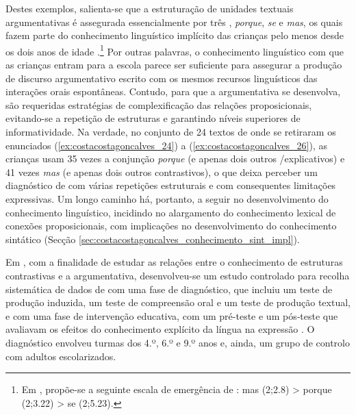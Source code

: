 \documentclass[output=paper]{LSP/langsci}
\begin{document}
Destes exemplos, salienta-se que a estruturação de unidades textuais argumentativas é assegurada essencialmente por três , \textit{porque}, \textit{se} e \textit{mas}, os quais fazem parte do conhecimento linguístico implícito das crianças pelo menos desde os dois anos de idade \citep{costa_etal2008}.\footnote{Em \citet{costa_etal2008}, propõe-se a seguinte escala de emergência de : mas (2;2.8) > porque (2;3.22) > se (2;5.23).} Por outras palavras, o conhecimento linguístico com que as crianças entram para a escola parece ser suficiente para assegurar a produção de discurso argumentativo escrito com os mesmos recursos linguísticos das interações orais espontâneas. Contudo, para que a  argumentativa se desenvolva, são requeridas estratégias de complexificação das relações proposicionais, evitando-se a repetição de estruturas e garantindo níveis superiores de informatividade. Na verdade, no conjunto de 24 textos de onde se retiraram os enunciados (\ref{ex:costacostagoncalves_24}) a (\ref{ex:costacostagoncalves_26}), as crianças usam 35 vezes a conjunção \textit{porque} (e apenas dois outros  /explicativos) e 41 vezes \textit{mas} (e apenas dois outros  contrastivos), o que deixa perceber um diagnóstico de  com várias repetições estruturais e com consequentes limitações expressivas. Um longo caminho há, portanto, a seguir no desenvolvimento do conhecimento linguístico, incidindo no alargamento do conhecimento lexical de conexões proposicionais, com implicações no desenvolvimento do conhecimento sintático (Secção \ref{sec:costacostagoncalves_conhecimento_sint_impl}).

Em \citet{alcosta2010}, com a finalidade de estudar as relações entre o conhecimento de estruturas contrastivas e a  argumentativa, desenvolveu-se um estudo controlado para recolha sistemática de dados de  com uma fase de diagnóstico, que incluiu um teste de produção induzida, um teste de compreensão oral e um teste de produção textual, e com uma fase de intervenção educativa, com um pré-teste e um pós‑teste que avaliavam os efeitos do conhecimento explícito da língua na expressão . O diagnóstico envolveu turmas dos 4.º, 6.º e 9.º anos e, ainda, um grupo de controlo com adultos escolarizados. 
\end{document}

